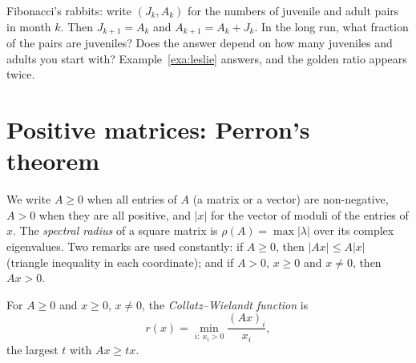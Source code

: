 \begin{think}
Fibonacci's rabbits: write $(J_k,A_k)$ for the numbers of juvenile and adult pairs in month $k$. Then $J_{k+1}=A_k$ and
$A_{k+1}=A_k+J_k$. In the long run, what fraction of the pairs are juveniles? Does the answer depend on how many juveniles
and adults you start with? Example~\ref{exa:leslie} answers, and the golden ratio appears twice.
\end{think}

\section{Positive matrices: Perron's theorem}

We write $A\ge0$ when all entries of $A$ (a matrix or a vector) are non-negative, $A>0$ when they are all positive, and
$|x|$ for the vector of moduli of the entries of $x$. The \emph{spectral radius} of a square matrix is $\rho(A)=\max|\lambda|$
over its complex eigenvalues. Two remarks are used constantly: if $A\ge0$, then $|Ax|\le A|x|$ (triangle inequality in each
coordinate); and if $A>0$, $x\ge0$ and $x\ne0$, then $Ax>0$.

For $A\ge0$ and $x\ge0$, $x\ne0$, the \emph{Collatz--Wielandt function} is
\[
r(x)=\min_{i:\ x_i>0}\frac{(Ax)_i}{x_i},
\]
the largest $t$ with $Ax\ge tx$.

